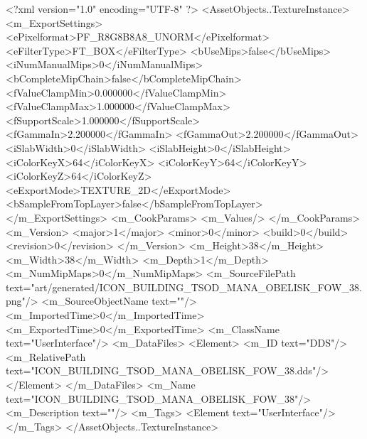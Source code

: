<?xml version="1.0" encoding="UTF-8" ?>
<AssetObjects..TextureInstance>
	<m_ExportSettings>
		<ePixelformat>PF_R8G8B8A8_UNORM</ePixelformat>
		<eFilterType>FT_BOX</eFilterType>
		<bUseMips>false</bUseMips>
		<iNumManualMips>0</iNumManualMips>
		<bCompleteMipChain>false</bCompleteMipChain>
		<fValueClampMin>0.000000</fValueClampMin>
		<fValueClampMax>1.000000</fValueClampMax>
		<fSupportScale>1.000000</fSupportScale>
		<fGammaIn>2.200000</fGammaIn>
		<fGammaOut>2.200000</fGammaOut>
		<iSlabWidth>0</iSlabWidth>
		<iSlabHeight>0</iSlabHeight>
		<iColorKeyX>64</iColorKeyX>
		<iColorKeyY>64</iColorKeyY>
		<iColorKeyZ>64</iColorKeyZ>
		<eExportMode>TEXTURE_2D</eExportMode>
		<bSampleFromTopLayer>false</bSampleFromTopLayer>
	</m_ExportSettings>
	<m_CookParams>
		<m_Values/>
	</m_CookParams>
	<m_Version>
		<major>1</major>
		<minor>0</minor>
		<build>0</build>
		<revision>0</revision>
	</m_Version>
	<m_Height>38</m_Height>
	<m_Width>38</m_Width>
	<m_Depth>1</m_Depth>
	<m_NumMipMaps>0</m_NumMipMaps>
	<m_SourceFilePath text="art/generated/ICON_BUILDING_TSOD_MANA_OBELISK_FOW_38.png"/>
	<m_SourceObjectName text=""/>
	<m_ImportedTime>0</m_ImportedTime>
	<m_ExportedTime>0</m_ExportedTime>
	<m_ClassName text="UserInterface"/>
	<m_DataFiles>
		<Element>
			<m_ID text="DDS"/>
			<m_RelativePath text="ICON_BUILDING_TSOD_MANA_OBELISK_FOW_38.dds"/>
		</Element>
	</m_DataFiles>
	<m_Name text="ICON_BUILDING_TSOD_MANA_OBELISK_FOW_38"/>
	<m_Description text=""/>
	<m_Tags>
		<Element text="UserInterface"/>
	</m_Tags>
</AssetObjects..TextureInstance>
